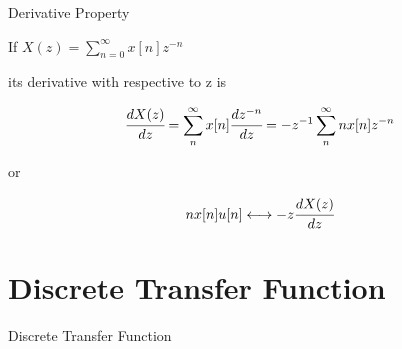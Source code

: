 \documentclass[aspectratio=169,xcolor=dvipsnames,svgnames,x11names,fleqn]{beamer}
\begin{document}
\begin{frame}{}
\vspace*{-9\baselineskip}
    \color{LightGray}{Blank space for calculation}
\end{frame}
\begin{frame}{}
\vspace*{-9\baselineskip}
    \color{LightGray}{Blank space for calculation}
\end{frame}
\begin{frame}{}
\vspace*{-9\baselineskip}
    \color{LightGray}{Blank space for calculation}
\end{frame}
\begin{frame}{}
\vspace*{-9\baselineskip}
    \color{LightGray}{Blank space for calculation}
\end{frame}
\begin{frame}{}
\vspace*{-9\baselineskip}
    \color{LightGray}{Blank space for calculation}
\end{frame}


\begin{frame}{Derivative Property}


    If $X(z) = \sum_{n=0}^\infty x[n]z^{-n}$

    its derivative with respective to z is 

    $$
\cfrac{dX(z)}{dz} = \sum_n^\infty x[n] \cfrac{dz^{-n}}{dz} = -z^{-1} \sum_n^\infty n x[n]z^{-n}
$$

or

$$
nx[n]u[n] \longleftrightarrow  -z\cfrac{dX(z)}{dz} 
$$
\end{frame}



\section{Discrete Transfer Function}


\begin{frame}{}
    \begin{center}
    \Huge \bf \color{DarkBlue}
    \faBuilding
    
   Discrete Transfer Function
\end{center}
\end{frame}
\end{document}
